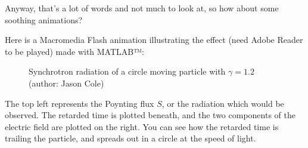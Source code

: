 	
	
	
	
	
	
	
	
	
	
	
	
	
	
	
	
	
	
	
	
	
	
	
	
	
	
	
	
	
	
	
	
	
	
	
	
	
	
	
	
	
	
	
	
	
	
	
	
	
	
	
	
	
	
	
	
	
	
	
	
	
	
	
	
	
	
	
	
	
	
	
	
	
	
	
	
	
	
	
	
	
	
	
	
	
	
	
	
	
	
	
	
	
	
	
	
	
	
	
	
	
	
	Anyway, that's a lot of words and not much to look at, so how about some soothing animations? 
	
	Here is a Macromedia Flash animation illustrating the effect (need Adobe Reader to be played) made with MATLAB™:
	\begin{figure}[H]
		\caption{Synchrotron radiation of a circle moving particle with $\gamma=1.2$ (author: Jason Cole)}
	\end{figure}
	The top left represents the Poynting flux $S$, or the radiation which would be observed. The retarded time is plotted beneath, and the two components of the electric field are plotted on the right. You can see how the retarded time is trailing the particle, and spreads out in a circle at the speed of light.

